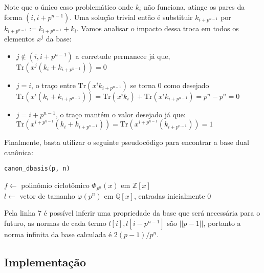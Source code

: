 Note que o único caso problemático onde $k_i$ não funciona, atinge os pares da forma $(i, i+ p^{n-1})$.
Uma solução trivial então é substituir $k_{i+ p^{n-1}}$ por $k_{i+ p^{n-1}}:=k_{i+ p^{n-1}} + k_i$. Vamos analisar
o impacto dessa troca em todos os elementos $x^j$ da base:
\begin{itemize}
    \item $j \notin (i, i+ p^{n-1})$ a corretude permanece já que, $\mathrm{Tr}(x^j(k_i + k_{i+ p^{n-1}})) = 0$
    \item $j = i$, o traço entre $\mathrm{Tr}(x^ik_{i+ p^{n-1}})$ se torna $0$ como desejado\\
    $\mathrm{Tr}(x^i(k_i + k_{i+ p^{n-1}})) = \mathrm{Tr}(x^ik_i) + \mathrm{Tr}(x^ik_{i+ p^{n-1}}) = p^n - p^n = 0$
    \item $j = i + p^{n-1}$, o traço mantém o valor desejado já que:\\
    $\mathrm{Tr}(x^{i+ p^{n-1}}(k_i + k_{i+ p^{n-1}})) = \mathrm{Tr}(x^{i+ p^{n-1}}(k_{i+ p^{n-1}})) = 1$
\end{itemize}

Finalmente, basta utilizar o seguinte pseudocódigo para encontrar a base dual canônica:

\begin{algorithm}[H]
    \caption{\texttt{canon\_dbasis(p, n)}}
    
    $f \gets$ polinômio ciclotômico $\Phi_{p^n}(x)$ em $\mathbb{Z} [x]$ \\
    $l \gets$ vetor de tamanho $\varphi(p^n)$ em $\mathbb{Q} [x]$, entradas inicialmente $0$ \\
    
    \end{algorithm}

Pela linha 7 é possível inferir uma propriedade da base que será necessária para o futuro, as normas de cada termo $l[i], l[i-p^{n-1}]$
são $||p-1||$, portanto a norma infinita da base calculada é $2(p-1)/p^n$.

\subsection{Implementação}

